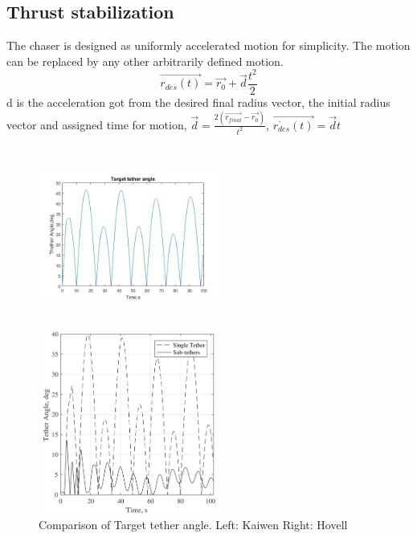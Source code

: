 \subsection{Thrust stabilization}
The chaser is designed as uniformly accelerated motion for simplicity. The motion can be replaced by any other arbitrarily defined motion.
\begin{equation}
\overrightarrow{r_{des}(t)}=\overrightarrow{r_0}+\overrightarrow{d}\frac{t^2}{2}
\end{equation} d is the acceleration got from the desired final radius vector, the initial radius vector and assigned time for motion, $\overrightarrow{d} = \frac{2(\overrightarrow{r_{final}}-\overrightarrow{r_0})}{t^2}$, $\overrightarrow{\dot{r_{des}}(t)}=\overrightarrow{d}t$ 
\begin{figure}[htbp]
\centering
\begin{minipage}[t]{0.48\textwidth}
\centering
\includegraphics[width=6cm,height=6cm]{fig/simulation/ThrustStable/Targettetherangle.jpg}
\end{minipage}
\begin{minipage}[t]{0.48\textwidth}
\centering
\includegraphics[width=6cm,height=6cm]{fig/simulation/ThrustStable/Targettetheranglesample.jpg}
\end{minipage}
\caption{Comparison of Target tether angle. Left: Kaiwen	Right: Hovell}
\end{figure}
